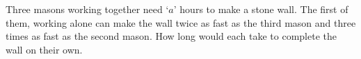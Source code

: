 
%
%
%
%
% 
% 

\question Three masons working together need `$a$' hours to make a stone wall. The first of them, working alone can make the wall twice as fast as the third mason and three times as fast as the second mason. How long would each take to complete the wall on their own.

\insertQR{}

\ifprintanswers
\fi 

